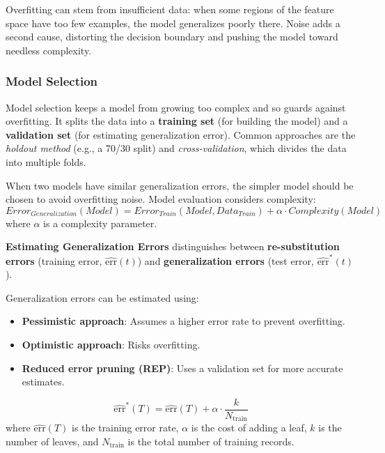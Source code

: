 Overfitting can stem from insufficient data: when some regions of the feature space have too few examples, the model generalizes poorly there. Noise adds a second cause, distorting the decision boundary and pushing the model toward needless complexity.

\subsubsection{Model Selection}
Model selection keeps a model from growing too complex and so guards against overfitting. It splits the data into a \textbf{training set} (for building the model) and a \textbf{validation set} (for estimating generalization error). Common approaches are the \textit{holdout method} (e.g., a 70/30 split) and \textit{cross-validation}, which divides the data into multiple folds.

When two models have similar generalization errors, the simpler model should be chosen to avoid overfitting noise. Model evaluation considers complexity:
\begin{equation}
Error_{Generalization}(Model) = Error_{Train}(Model, Data_{Train}) + \alpha \cdot Complexity(Model)
\end{equation}
where $\alpha$ is a complexity parameter.

\textbf{Estimating Generalization Errors} distinguishes between \textbf{re-substitution errors} (training error, $\hat{\text{err}}(t)$) and \textbf{generalization errors} (test error, $\hat{\text{err}}^*(t)$).

Generalization errors can be estimated using:
\begin{itemize}
    \item \textbf{Pessimistic approach}: Assumes a higher error rate to prevent overfitting.
    \item \textbf{Optimistic approach}: Risks overfitting.
    \item \textbf{Reduced error pruning (REP)}: Uses a validation set for more accurate estimates.
\end{itemize}

\begin{example}
\begin{equation}
\hat{\text{err}}^*(T) = \hat{\text{err}}(T) + \alpha \cdot \frac{k}{N_{\text{train}}}
\end{equation}
where $\hat{\text{err}}(T)$ is the training error rate, $\alpha$ is the cost of adding a leaf, $k$ is the number of leaves, and $N_{\text{train}}$ is the total number of training records.
\end{example}
